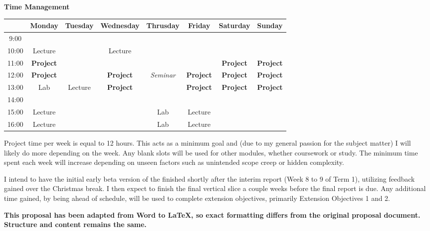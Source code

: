 \documentclass{report}
\begin{document}
\begin{appendices}
\textbf{Time Management}

\begin{table}[htbp]
\begin{tabular}{|c|c|c|c|c|c|c|c|}
\hline
 & Monday & Tuesday & Wednesday & Thrusday & Friday & Saturday & Sunday \\
\hline
9:00 &&&&&&& \\
\hline
10:00 & Lecture & & Lecture &&&& \\
\hline
11:00 & \textbf{Project} &&&&&  \textbf{Project} &  \textbf{Project} \\
\hline
12:00 & \textbf{Project} & & \textbf{Project} & \textit{Seminar} & \textbf{Project} & \textbf{Project} & \textbf{Project} \\
\hline
13:00 & Lab & Lecture &  \textbf{Project} & &  \textbf{Project} &  \textbf{Project} &  \textbf{Project} \\
\hline
14:00 &&&&&&& \\
\hline
15:00 & Lecture & & & Lab & Lecture && \\
\hline
16:00 & Lecture & & & Lab & Lecture && \\
\hline
\end{tabular}
\label{tab:schedule}
\end{table}

Project time per week is equal to 12 hours. This acts as a minimum goal and (due to my general passion for the subject matter) I will likely do more depending on the week. Any blank slots will be used for other modules, whether coursework or study. The minimum time spent each week will increase depending on unseen factors such as unintended scope creep or hidden complexity.

I intend to have the initial early beta version of the finished shortly after the interim report (Week 8 to 9 of Term 1), utilizing feedback gained over the Christmas break. I then expect to finish the final vertical slice a couple weeks before the final report is due. Any additional time gained, by being ahead of schedule, will be used to complete extension objectives, primarily Extension Objectives 1 and 2.

\noindent\makebox[\linewidth]{\rule{\paperwidth}{0.4pt}}

\begin{center}
\textbf{This proposal has been adapted from Word to \LaTeX{}, so exact formatting differs from the original proposal document. Structure and content remains the same.}
\end{center}
\end{appendices}
\end{document}
